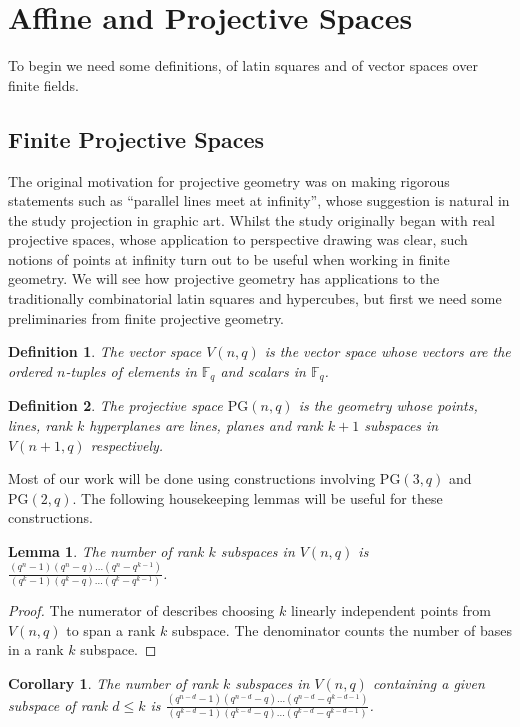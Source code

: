 \documentclass{article}
\newtheorem{lemma}{Lemma}
\newtheorem{corollary}{Corollary}
\newtheorem{definition}{Definition}
\newcommand{\PG}{\mathrm{PG}}
\begin{document}

    \section{Affine and Projective Spaces}
    To begin we need some definitions, of latin squares and of vector spaces over finite fields.

    \subsection{Finite Projective Spaces}

    The original motivation for projective geometry was on making rigorous statements such as “parallel lines meet at infinity”, whose suggestion is natural in the study projection in graphic art. Whilst the study originally began with real projective spaces, whose application to perspective drawing was clear, such notions of points at infinity turn out to be useful when 
    working in finite geometry. We will see how projective geometry has applications to the traditionally combinatorial latin squares and hypercubes, but first we need some preliminaries from finite projective geometry.

    \begin{definition}
        The vector space \(V(n, q)\) is the vector space whose vectors are the ordered \(n\)-tuples of elements in \(\mathbb{F}_q\) and scalars in \(\mathbb{F}_q\).
    \end{definition}

    \begin{definition}
        The projective space \(\PG(n, q)\) is the geometry whose points, lines, rank \(k\) hyperplanes are lines, planes and rank \(k + 1\) subspaces in \(V(n + 1, q)\) respectively. 
    \end{definition}

    Most of our work will be done using constructions involving \(\PG(3, q)\) and \(\PG(2, q)\). The following housekeeping lemmas will be useful for these constructions.

    \begin{lemma}\label{lemma:1}
        The number of rank \(k\) subspaces in \(V(n, q)\) is \(\frac{(q^n - 1)(q^n - q)\ldots (q^n - q^{k - 1})}{(q^k - 1)(q^k - q)\ldots (q^k - q^{k - 1})}\).
    \end{lemma}
    \begin{proof}
        The numerator of describes choosing \(k\) linearly independent points from \(V(n, q)\) to span a rank \(k\) subspace. The denominator counts the number of bases in a rank \(k\) subspace.
    \end{proof}
    \begin{corollary}
        The number of rank \(k\) subspaces in \(V(n, q)\) containing a given subspace of rank \(d \leq k\) is 
        \(\frac{(q^{n - d} - 1)(q^{n - d} - q) \ldots (q^{n - d} - q^{k - d - 1})}{(q^{k - d} - 1) (q^{k - d} - q) \ldots (q^{k - d} - q^{k - d - 1})}\).
    \end{corollary}
\end{document}
